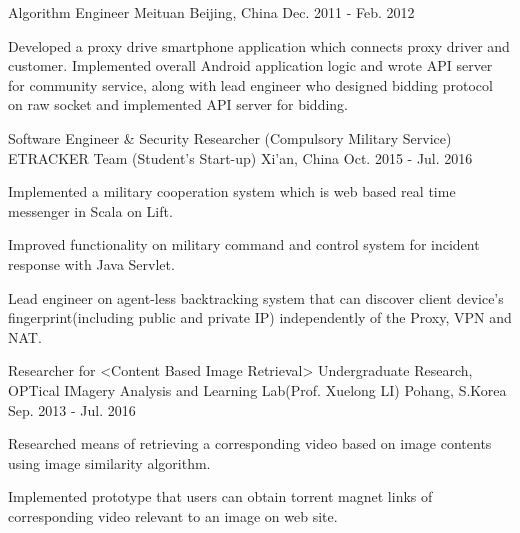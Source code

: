 

\begin{cventries}

  \cventry
    {Algorithm Engineer} %
    {Meituan} %
    {Beijing, China} %
    {Dec. 2011 - Feb. 2012} %
    {
      \begin{cvitems} %
        \item {Developed a proxy drive smartphone application which connects proxy driver and customer. Implemented overall Android application logic and wrote API server for community service, along with lead engineer who designed bidding protocol on raw socket and implemented API server for bidding.}
      \end{cvitems}
    }

  \cventry
    {Software Engineer \& Security Researcher (Compulsory Military Service)} %
    {ETRACKER Team (Student's Start-up)} %
    {Xi'an, China} %
    {Oct. 2015 - Jul. 2016} %
    {
      \begin{cvitems} %
        \item {Implemented a military cooperation system which is web based real time messenger in Scala on Lift.}
        \item {Improved functionality on military command and control system for incident response with Java Servlet.}
        \item {Lead engineer on agent-less backtracking system that can discover client device's fingerprint(including public and private IP) independently of the Proxy, VPN and NAT.}
      \end{cvitems}
    }

  \cventry
    {Researcher for <Content Based Image Retrieval>} %
    {Undergraduate Research, OPTical IMagery Analysis and Learning Lab(Prof. Xuelong LI)} %
    {Pohang, S.Korea} %
    {Sep. 2013 - Jul. 2016} %
    {
      \begin{cvitems} %
        \item {Researched means of retrieving a corresponding video based on image contents using image similarity algorithm.}
        \item {Implemented prototype that users can obtain torrent magnet links of corresponding video relevant to an image on web site.}
      \end{cvitems}
    }

\end{cventries}
